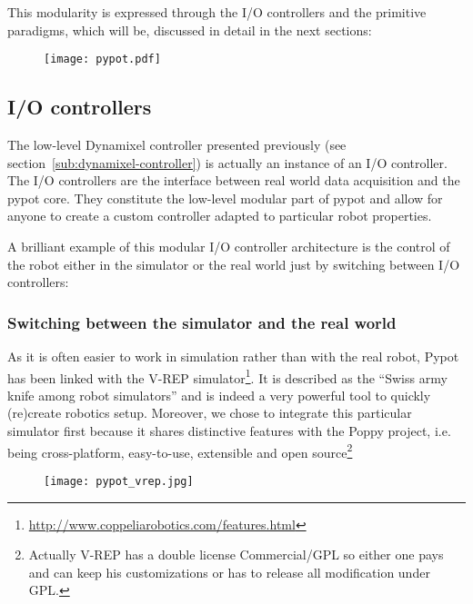 This modularity is expressed through the I/O controllers and the primitive paradigms, which will be, discussed in detail in the next sections:


\begin{figure}[p]
    \begin{center}
        \texttt{[image: pypot.pdf]}
    \end{center}
    \caption{}
    \label{fig:pypot-modular-architecture}
\end{figure}


\subsection{I/O controllers} %
\label{sub:io-controllers}

The low-level Dynamixel controller presented previously (see section~\ref{sub:dynamixel-controller}) is actually an instance of an I/O controller. The I/O controllers are the interface between real world data acquisition and the pypot core. They constitute the low-level modular part of pypot and allow for anyone to create a custom controller adapted to particular robot properties.

A brilliant example of this modular I/O controller architecture is the control of the robot either in the simulator or the real world just by switching between I/O controllers:

\subsubsection{Switching between the simulator and the real world} %

As it is often easier to work in simulation rather than with the real robot, Pypot has been linked with the V-REP simulator\footnote{\url{http://www.coppeliarobotics.com/features.html}}. It is described as the “Swiss army knife among robot simulators” and is indeed a very powerful tool to quickly (re)create robotics setup. Moreover, we chose to integrate this particular simulator first because it shares distinctive features with the Poppy project, i.e. being cross-platform, easy-to-use, extensible and open source\footnote{Actually V-REP has a double license Commercial/GPL so either one pays and can keep his customizations or has to release all modification under GPL.}

\begin{figure}[tb]
    \begin{center}
        \texttt{[image: pypot\_vrep.jpg]}
    \end{center}
    \caption{}
    \label{fig:pypot-vrep}
\end{figure}


